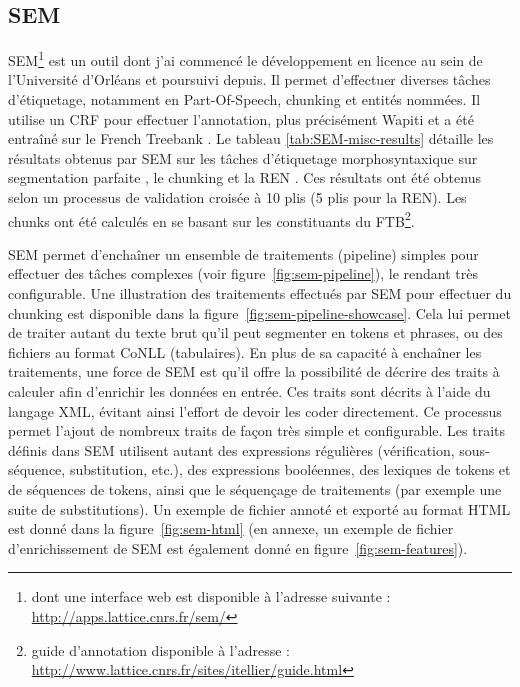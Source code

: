 \documentclass[12pt,a4paper,times,twoside,openright]{report}
\begin{document}
        \subsection{SEM}
        \label{subsec:SEM}
SEM\footnote{dont une interface web est disponible à l'adresse suivante : \url{http://apps.lattice.cnrs.fr/sem/}} \citep{tellier2012segmenteur,dupont2014reconnaisseur} est un outil dont j'ai commencé le développement en licence au sein de l'Université d'Orléans et poursuivi depuis. Il permet d'effectuer diverses tâches d'étiquetage, notamment en Part-Of-Speech, chunking et entités nommées. Il utilise un CRF pour effectuer l'annotation, plus précisément Wapiti \citep{lavergne10} et a été entraîné sur le French Treebank \citep{Abeille03,sagot2012annotation}. Le tableau \ref{tab:SEM-misc-results} détaille les résultats obtenus par SEM sur les tâches d'étiquetage morphosyntaxique sur segmentation parfaite \citep{constant2011integrer}, le chunking \citep{tellier2013symbolic} et la REN \citep{dupont2014reconnaisseur}. Ces résultats ont été obtenus selon un processus de validation croisée à 10 plis (5 plis pour la REN). Les chunks ont été calculés en se basant sur les constituants du FTB\footnote{guide d'annotation disponible à l'adresse : \url{http://www.lattice.cnrs.fr/sites/itellier/guide.html}}.

SEM permet d'enchaîner un ensemble de traitements (pipeline) simples pour effectuer des tâches complexes (voir figure\ \ref{fig:sem-pipeline}), le rendant très configurable. Une illustration des traitements effectués par SEM pour effectuer du chunking est disponible dans la figure\ \ref{fig:sem-pipeline-showcase}. Cela lui permet de traiter autant du texte brut qu'il peut segmenter en tokens et phrases, ou des fichiers au format CoNLL (tabulaires). En plus de sa capacité à enchaîner les traitements, une force de SEM est qu'il offre la possibilité de décrire des traits à calculer afin d'enrichir les données en entrée. Ces traits sont décrits à l'aide du langage XML, évitant ainsi l'effort de devoir les coder directement. Ce processus permet l'ajout de nombreux traits de façon très simple et configurable. Les traits définis dans SEM utilisent autant des expressions régulières (vérification, sous-séquence, substitution, etc.), des expressions booléennes, des lexiques de tokens et de séquences de tokens, ainsi que le séquençage de traitements (par exemple une suite de substitutions). Un exemple de fichier annoté et exporté au format HTML est donné dans la figure\ \ref{fig:sem-html} (en annexe, un exemple de fichier d'enrichissement de SEM est également donné en figure\ \ref{fig:sem-features}).
\end{document}

